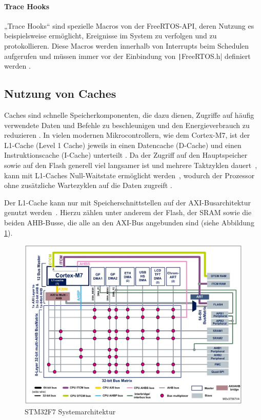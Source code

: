 \paragraph{Trace Hooks}

„Trace Hooks“ sind spezielle Macros von der FreeRTOS-API, deren Nutzung es
beispielsweise ermöglicht, Ereignisse im System zu verfolgen und zu
protokollieren. Diese Macros werden innerhalb von Interrupts beim Schedulen
aufgerufen und müssen immer vor der Einbindung von \texttt|FreeRTOS.h|
definiert werden \cite{freertos_rtos_trace_hooks}.

\subsection{Nutzung von Caches}

Caches sind schnelle Speicherkomponenten, die dazu dienen, Zugriffe auf häufig
verwendete Daten und Befehle zu beschleunigen und den Energieverbrauch zu
reduzieren \cite{ka001150}. In vielen modernen Mikrocontrollern, wie dem
Cortex-M7, ist der L1-Cache (Level 1 Cache) jeweils in einen Datencache
(D-Cache) und einen Instruktionscache (I-Cache) unterteilt \cite[S. 6]{an4667}.
Da der Zugriff auf den Hauptspeicher sowie auf den Flash generell viel langsamer
ist und mehrere Taktzyklen dauert~\cite{stm32_memory_sections}, kann mit
L1-Caches Null-Waitstate ermöglicht werden~\cite[S. 6]{an4667}, wodurch der
Prozessor ohne zusätzliche Wartezyklen auf die Daten zugreift
\cite{waitstate_wiki}.

Der L1-Cache kann nur mit Speicherschnittstellen auf der \ac{AXI}-Busarchitektur
genutzt werden~\cite[S. 4]{an4839}. Hierzu zählen unter anderem der Flash, der
\ac{SRAM} sowie die beiden \ac{AHB}-Busse, die alle an den AXI-Bus angebunden
sind (siehe Abbildung \ref{fig:m7_sys_arch}).

\begin{figure}[htb]
    \centering
    \includegraphics[width=1\textwidth]{assets/m7_system_arch}
    \caption{STM32F7 Systemarchitektur \cite[S. 9]{an4667}}
    \label{fig:m7_sys_arch}
\end{figure}

